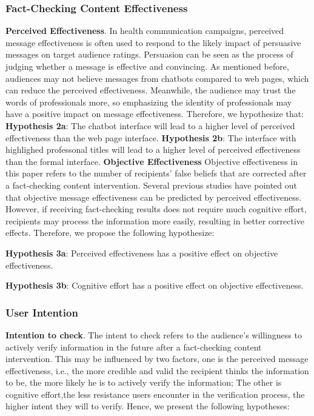 \subsubsection*{Fact-Checking Content Effectiveness}
\textbf{Perceived Effectiveness}.
In health communication campaigns, perceived message effectiveness is often used to respond to the likely impact of persuasive messages on target audience ratings\cite[]{noar2020does}.
Persuasion can be seen as the process of judging whether a message is effective and convincing\cite[]{dillard2007does}.
As mentioned before, audiences may not believe messages from chatbots compared to web pages, which can reduce the perceived effectiveness.
Meanwhile, the audience may trust the words of professionals more, so emphasizing the identity of professionals may have a positive impact on message effectiveness.
Therefore, we hypothesize that:
\textbf{Hypothesis 2a}:
The chatbot interface will lead to a higher level of perceived effectiveness than the web page interface.
\textbf{Hypothesis 2b}:
The interface with highlighed professonal titles will lead to a higher level of perceived effectiveness than the formal interface.
\textbf{Objective Effectiveness}
Objective effectiveness in this paper refers to the number of recipients' false beliefs that are corrected after a fact-checking content intervention.
Several previous studies have pointed out that objective message effectiveness can be predicted by perceived effectiveness\cite[]{noar2010assessing,noar2020does,dillard2007does}.
However, if receiving fact-checking results does not require much cognitive effort, recipients may process the information more easily, resulting in better corrective effects.
Therefore, we propose the following hypothesize:

\textbf{Hypothesis 3a}:
Perceived effectiveness has a positive effect on objective effectiveness.

\textbf{Hypothesis 3b}:
Cognitive effort has a positive effect on objective effectiveness.

\subsubsection*{User Intention}
\textbf{Intention to check}.
The intent to check refers to the audience's willingness to actively verify information in the future after a fact-checking content intervention.
This may be influenced by two factors, one is the perceived message effectiveness, i.e., the more credible and valid the recipient thinks the information to be, the more likely he is to actively verify the information;
The other is cognitive effort,the less resistance users encounter in the verification process, the higher intent they will to verify.
Hence, we present the following hypotheses:

